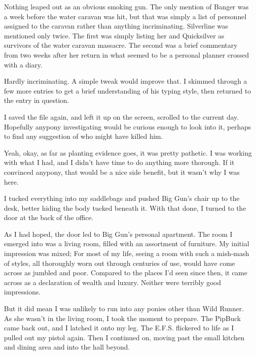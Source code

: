Nothing leaped out as an obvious smoking gun. The only mention of Banger was a week before the water caravan was hit, but that was simply a list of personnel assigned to the caravan rather than anything incriminating. Silverline was mentioned only twice. The first was simply listing her and Quicksilver as survivors of the water caravan massacre. The second was a brief commentary from two weeks after her return in what seemed to be a personal planner crossed with a diary.


Hardly incriminating. A simple tweak would improve that. I skimmed through a few more entries to get a brief understanding of his typing style, then returned to the entry in question.


I saved the file again, and left it up on the screen, scrolled to the current day. Hopefully anypony investigating would be curious enough to look into it, perhaps to find any suggestion of who might have killed him.

Yeah, okay, as far as planting evidence goes, it was pretty pathetic. I was working with what I had, and I didn’t have time to do anything more thorough. If it convinced anypony, that would be a nice side benefit, but it wasn’t why I was here.

I tucked everything into my saddlebags and pushed Big Gun’s chair up to the desk, better hiding the body tucked beneath it. With that done, I turned to the door at the back of the office.

As I had hoped, the door led to Big Gun’s personal apartment. The room I emerged into was a living room, filled with an assortment of furniture. My initial impression was mixed; For most of my life, seeing a room with such a mish-mash of styles, all thoroughly worn out through centuries of use, would have come across as jumbled and poor. Compared to the places I’d seen since then, it came across as a declaration of wealth and luxury. Neither were terribly good impressions.

But it did mean I was unlikely to run into any ponies other than Wild Runner. As she wasn’t in the living room, I took the moment to prepare. The PipBuck came back out, and I latched it onto my leg. The E.F.S. flickered to life as I pulled out my pistol again. Then I continued on, moving past the small kitchen and dining area and into the hall beyond.

